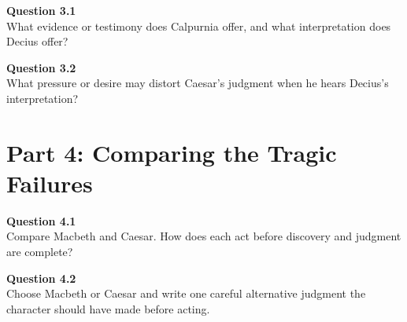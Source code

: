 \documentclass[12pt]{article}
\begin{document}
\textbf{Question 3.1}\\[-0.15em]
What evidence or testimony does Calpurnia offer, and what interpretation does Decius offer?


\textbf{Question 3.2}\\[-0.15em]
What pressure or desire may distort Caesar's judgment when he hears Decius's interpretation?


\newpage

\section*{Part 4: Comparing the Tragic Failures}

\textbf{Question 4.1}\\[-0.15em]
Compare Macbeth and Caesar. How does each act before discovery and judgment are complete?


\textbf{Question 4.2}\\[-0.15em]
Choose Macbeth or Caesar and write one careful alternative judgment the character should have made before acting.

\end{document}
